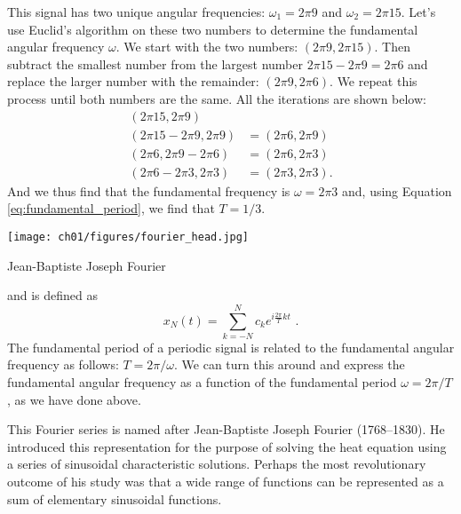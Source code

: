 This signal has two unique angular frequencies: $\omega_1 = 2\pi 9$
and $\omega_2 = 2\pi 15$.  Let's use Euclid's algorithm on these two numbers to determine
the fundamental angular frequency $\omega$.  We start with the two
numbers: $(2\pi 9, 2\pi15)$. Then subtract the smallest number from
the largest number $2\pi 15 - 2\pi 9 = 2\pi 6$ and replace the larger
number with the remainder: $(2\pi 9, 2\pi 6)$.  We repeat this process
until both numbers are the same.  All the iterations are shown below:
\begin{align*}
  (2\pi 15, 2\pi 9)        &                     \\
  (2\pi 15-2\pi 9, 2\pi 9) & = (2\pi 6, 2\pi 9)  \\
  (2\pi 6, 2\pi 9-2\pi 6)  & = (2\pi 6, 2\pi 3)  \\
  (2\pi 6-2\pi 3, 2\pi 3)  & = (2\pi 3, 2\pi 3).
\end{align*}
And we thus find that the fundamental frequency is $\omega=2\pi 3$ and, using
Equation \ref{eq:fundamental_period}, we find that $T = 1/3$.

\begin{marginfigure}[1cm]
  \begin{center}
    \texttt{[image: ch01/figures/fourier\_head.jpg]}
  \end{center}
  \caption{Jean-Baptiste Joseph Fourier}
  \label{fig:joe_fourier2}
\end{marginfigure}

 and is defined as
\begin{equation}
  \boxed{
    x_N(t) = \sum_{k=-N}^{N} c_k e^{i \frac{2\pi}{T} k t}
    \label{eq:synthesis_eq}
  } \,\,.
\end{equation}
The fundamental period of a periodic signal is related to the fundamental angular frequency
as follows: $T=2\pi/\omega$.
We can turn this around and express the fundamental angular frequency as a function of
the fundamental period $\omega=2\pi/T$, as we have done above.


This Fourier series is named after Jean-Baptiste Joseph Fourier
(1768–1830).  He introduced this representation for the purpose of
solving the heat equation using a series of sinusoidal characteristic
solutions. Perhaps the most revolutionary outcome of his study was
that a wide range of functions can be represented as a sum of
elementary sinusoidal functions.

